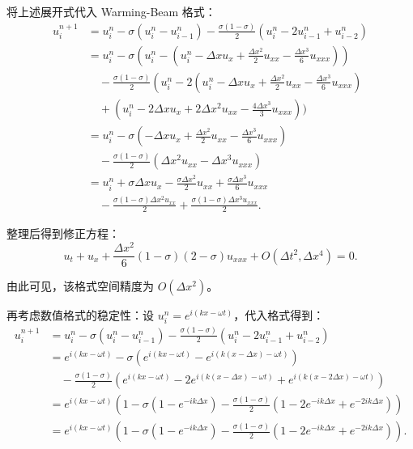\documentclass[12pt,a4paper]{article}
\begin{document}
将上述展开式代入 Warming-Beam 格式：
\[
\begin{aligned}
u_i^{n+1} &= u_i^n - \sigma \left( u_i^n - u_{i-1}^n \right) - \frac{\sigma (1-\sigma)}{2} \left( u_i^n - 2u_{i-1}^n + u_{i-2}^n \right) \\
&= u_i^n - \sigma \left( u_i^n - \left( u_i^n - \Delta x u_x + \frac{\Delta x^2}{2} u_{xx} - \frac{\Delta x^3}{6} u_{xxx} \right) \right) \\
&\quad - \frac{\sigma (1-\sigma)}{2} \left( u_i^n - 2\left( u_i^n - \Delta x u_x + \frac{\Delta x^2}{2} u_{xx} - \frac{\Delta x^3}{6} u_{xxx} \right) \right. \\
&\quad + \left( u_i^n - 2\Delta x u_x + 2\Delta x^2 u_{xx} - \frac{4\Delta x^3}{3} u_{xxx} \right) \Bigg) \\
&= u_i^n - \sigma \left( -\Delta x u_x + \frac{\Delta x^2}{2} u_{xx} - \frac{\Delta x^3}{6} u_{xxx} \right) \\
&\quad - \frac{\sigma (1-\sigma)}{2} \left(  \Delta x^2 u_{xx} - \Delta x^3 u_{xxx} \right) \\
&= u_i^n + \sigma \Delta x u_x - \frac{\sigma \Delta x^2}{2} u_{xx} + \frac{\sigma \Delta x^3}{6} u_{xxx} \\
&\quad - \frac{\sigma (1-\sigma) \Delta x^2 u_{xx}}{2} + \frac{\sigma (1-\sigma) \Delta x^3 u_{xxx}}{2}.
\end{aligned}
\]

整理后得到修正方程：
\[
u_t + u_x + \frac{\Delta x^2}{6} (1 - \sigma)(2 - \sigma) u_{xxx} + O(\Delta t^2, \Delta x^4) = 0.
\]

由此可见，该格式空间精度为 $O(\Delta x^2)$。



再考虑数值格式的稳定性：设 $u_i^n = e^{i(kx - \omega t)}$，代入格式得到：
\[
\begin{aligned}
u_i^{n+1} &= u_i^n - \sigma \left( u_i^n - u_{i-1}^n \right) - \frac{\sigma (1-\sigma)}{2} \left( u_i^n - 2u_{i-1}^n + u_{i-2}^n \right) \\
&= e^{i(kx - \omega t)} - \sigma \left( e^{i(kx - \omega t)} - e^{i(k(x - \Delta x) - \omega t)} \right) \\
&\quad - \frac{\sigma (1-\sigma)}{2} \left( e^{i(kx - \omega t)} - 2e^{i(k(x - \Delta x) - \omega t)} + e^{i(k(x - 2\Delta x) - \omega t)} \right) \\
&= e^{i(kx - \omega t)} \left( 1 - \sigma (1 - e^{-ik\Delta x}) - \frac{\sigma (1-\sigma)}{2} (1 - 2e^{-ik\Delta x} + e^{-2ik\Delta x}) \right) \\
&= e^{i(kx - \omega t)} \left( 1 - \sigma (1 - e^{-ik\Delta x}) - \frac{\sigma (1-\sigma)}{2} (1 - 2e^{-ik\Delta x} + e^{-2ik\Delta x}) \right).
\end{aligned}
\]
\end{document}
